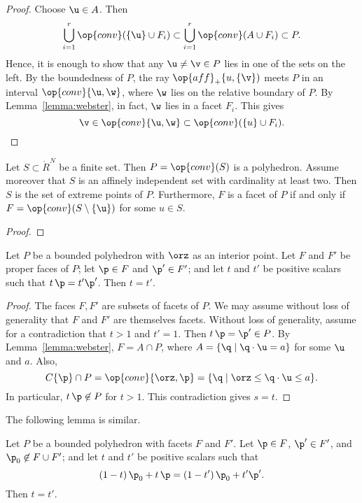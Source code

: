 \begin{proof}
Choose $\u\in A$.   Then
\[ 
\bigcup_{i=1}^r \op{conv}(\{\u\}\cup F_i) \subset \bigcup_{i=1}^r \op{conv}(A\cup F_i)\subset P.
\] 
Hence, it is enough to show that any $\u\ne\v\in P$ lies in one of the sets on the left.
By the boundedness of $P$, the ray $\op{aff}_+\{u,\{\v\})$ meets $P$ in an interval
$\op{conv}\{\u,\w\}$, where $\w$ lies on the relative boundary of $P$.  By Lemma~\ref{lemma:webster}, in fact, $\w$ lies in a facet $F_i$.  This gives
\[ 
 \v\in \op{conv}\{\u,\w\}\subset \op{conv}(\{u\}\cup F_i).
\] 
\end{proof}


\begin{lemma}[]\label{lemma:simplex-poly}
  Let $S\subset\ring{R}^N$ be a finite set.  Then $P=\op{conv}(S)$ is
  a polyhedron.  Assume moreover that $S$ is an affinely independent
  set with cardinality at least two.  Then $S$ is the set of extreme
  points of $P$. Furthermore,   $F$ is a facet of $P$ if and only if $F =
  \op{conv}(S\setminus \{\u\})$ for some $u\in S$.
\end{lemma}

\begin{proof}
\end{proof}

\begin{lemma}[]\cutrate{} \label{lemma:scale} 
Let $P$ be a bounded polyhedron with $\orz$ as an interior point.
Let $F$ and $F'$ be proper faces of $P$; let $\p\in F$ and
$\p'\in F'$; and let  $t$ and $t'$ be  positive scalars such that $t\, \p = t' \p'$.
Then $t=t'$.
\end{lemma}

\begin{proof} The faces $F,F'$ are subsets of facets of $P$.  We may assume
without loss of generality that $F$ and $F'$ are themselves facets.  Without
loss of generality, assume for a contradiction that $t>1$ and $t'=1$.
Then $t\, \p = \p'\in P$.
By Lemma~\ref{lemma:webster}, $F = A \cap P$, where $A= \{\q
\mid \q\cdot \u = a\}$ for some $\u$ and $a$.  Also,
\[ 
C\{\p\}\cap P = \op{conv}\{\orz,\p\} = \{\q \mid \orz\le \q\cdot \u \le a\}.
\] 
In particular, $t\, \p\not\in P$ for $t>1$.  This contradiction gives
$s = t$.
\end{proof}

The following lemma is similar.

\begin{lemma}[]\cutrate{} \label{lemma:scale2} 
Let $P$ be a bounded polyhedron with facets $F$ and $F'$.
Let $\p\in F$,
$\p'\in F'$, 
and $\p_0\not\in F\cup F'$; and let  $t$ and $t'$ be  positive scalars such that 
\[
(1-t)\, \p_0 + t\, \p = (1-t')\, \p_0 + t' \p'.
\]
Then $t=t'$.
\end{lemma}


